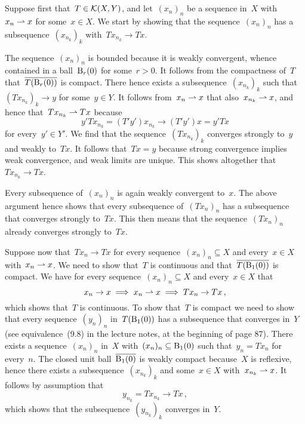 \section{}

Suppose first that~$T \in \mathcal{K}(X,Y)$, and let~$(x_n)_n$ be a sequence in~$X$ with~$x_n \rightharpoonup x$ for some~$x \in X$.
We start by showing that the sequence~$(x_n)_n$ has a subsequence~$(x_{n_k})_k$ with~$T x_{n_k} \to T x$.

The sequence~$(x_n)_n$ is bounded because it is weakly convergent, whence contained in a ball~$\operatorname{B}_{r}(0)$ for some~$r > 0$.
It follows from the compactness of~$T$ that~$\overline{ T( \operatorname{B}_{r}(0) ) }$ is compact.
There hence exists a subsequence~$(x_{n_k})_k$ such that~$( T x_{n_k} )_k \to y$ for some~$y \in Y$.
It follows from~$x_n \rightharpoonup x$ that also~$x_{n_k} \rightharpoonup x$, and hence that~$T x_{n_k} \rightharpoonup T x$ because
\[
  y' T x_{n_k}
  =
  (T' y') x_{n_k}
  \to
  (T' y') x
  =
  y' T x
\]
for every~$y' \in Y'$.
We find that the sequence~$(T x_{n_k})_k$ converges strongly to~$y$ and weakly to~$T x$.
It follows that~$Tx = y$ because strong convergence implies weak convergence, and weak limits are unique.
This shows altogether that~$T x_{n_k} \to T x$.

Every subsequence of~$(x_n)_n$ is again weakly convergent to~$x$.
The above argument hence shows that every subsequence of~$(T x_n)_n$ has a subsequence that converges strongly to~$T x$.
This then means that the sequence~$(T x_n)_n$ already converges strongly to~$T x$.

Suppose now that~$T x_n \to Tx$ for every sequence~$(x_n)_n \subseteq X$ and every~$x \in X$ with~$x_n \rightharpoonup x$.
We need to show that~$T$ is continuous and that~$\overline{ T( \operatorname{B}_{1}(0) ) }$ is compact.
We have for every sequence~$(x_n)_n \subseteq X$ and every~$x \in X$ that
\[
  x_n \to x
  \implies
  x_n \rightharpoonup x
  \implies
  T x_n \to T x \,,
\]
which shows that~$T$ is continuous.
To show that~$T$ is compact we need to show that every sequence~$(y_n)_n$ in~$T( \operatorname{B}_{1}(0) )$ has a subsequence that converges in~$Y$ (see equivalence~(9.8) in the lecture notes, at the beginning of page 87).
There exists a sequence~$(x_n)_n$ in~$X$ with~$(x_n)_n \subseteq \operatorname{B}_{1}(0)$ such that~$y_n = T x_n$ for every~$n$.
The closed unit ball~$\overline{\operatorname{B}_{1}(0)}$ is weakly compact because~$X$ is reflexive, hence there exists a subsequence~$(x_{n_k})_k$ and some~$x \in X$ with~$x_{n_k} \rightharpoonup x$.
It follows by assumption that
\[
  y_{n_k}
  =
  T x_{n_k}
  \to
  T x \,,
\]
which shows that the subsequence~$(y_{n_k})_k$ converges in~$Y$.



